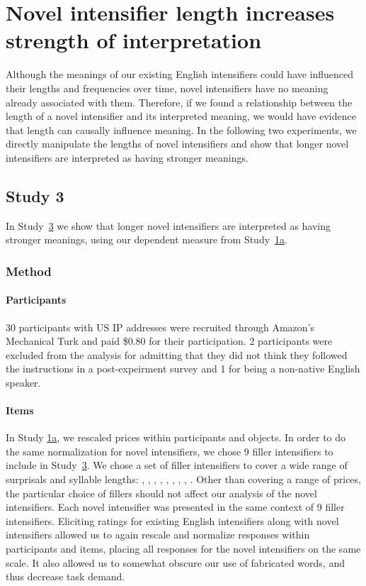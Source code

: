 \section{Novel intensifier length increases strength of interpretation}

Although the meanings of our existing English intensifiers could have influenced their lengths and frequencies over time, novel intensifiers have no meaning already associated with them. Therefore, if we found a relationship between the length of a novel intensifier and its interpreted meaning, we would have evidence that length can causally influence meaning. In the following two experiments, we directly manipulate the lengths of novel intensifiers and show that longer novel intensifiers are interpreted as having stronger meanings.

\subsection{Study 3 \label{sec:study3}}

In Study~\hyperref[sec:study3]{3} we show that longer novel intensifiers are interpreted as having stronger meanings, using our dependent measure from Study~\hyperref[sec:study1a]{1a}.

\subsubsection{Method}

\paragraph{Participants}

30 participants with US IP addresses were recruited through Amazon's Mechanical Turk and paid \$0.80 for their participation. 2 participants were excluded from the analysis for admitting that they did not think they followed the instructions in a post-expeirment survey and 1 for being a non-native English speaker.

\paragraph{Items}

In Study \hyperref[sec:study1a]{1a}, we rescaled prices within participants and objects.
In order to do the same normalization for novel intensifiers, we chose 9 filler intensifiers to include in Study~\hyperref[sec:study3]{3}.
We chose a set of filler intensifiers to cover a wide range of surprisals and syllable lengths: , , , , , , , , .
Other than covering a range of prices, the particular choice of fillers should not affect our analysis of the novel intensifiers.
Each novel intensifier was presented in the same context of 9 filler intensifiers.
Eliciting ratings for existing English intensifiers along with novel intensifiers allowed us to again rescale and normalize responses within participants and items, placing all responses for the novel intensifiers on the same scale.
It also allowed us to somewhat obscure our use of fabricated words, and thus decrease task demand.

